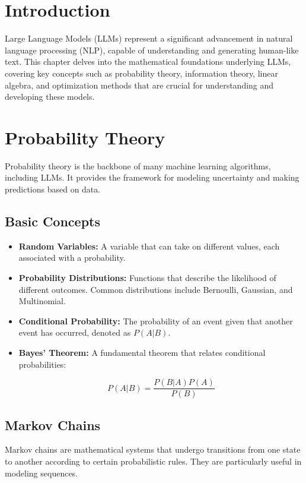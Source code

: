\section{Introduction}
Large Language Models (LLMs) represent a significant advancement in natural language processing (NLP), capable of understanding and generating human-like text. This chapter delves into the mathematical foundations underlying LLMs, covering key concepts such as probability theory, information theory, linear algebra, and optimization methods that are crucial for understanding and developing these models.

\section{Probability Theory}
Probability theory is the backbone of many machine learning algorithms, including LLMs. It provides the framework for modeling uncertainty and making predictions based on data.

\subsection{Basic Concepts}
\begin{itemize}
    \item \textbf{Random Variables:} A variable that can take on different values, each associated with a probability.
    \item \textbf{Probability Distributions:} Functions that describe the likelihood of different outcomes. Common distributions include Bernoulli, Gaussian, and Multinomial.
    \item \textbf{Conditional Probability:} The probability of an event given that another event has occurred, denoted as \( P(A|B) \).
    \item \textbf{Bayes' Theorem:} A fundamental theorem that relates conditional probabilities:

    \begin{equation}
    P(A|B) = \frac{P(B|A)P(A)}{P(B)}
    \end{equation}
\end{itemize}

\subsection{Markov Chains}
Markov chains are mathematical systems that undergo transitions from one state to another according to certain probabilistic rules. They are particularly useful in modeling sequences.

